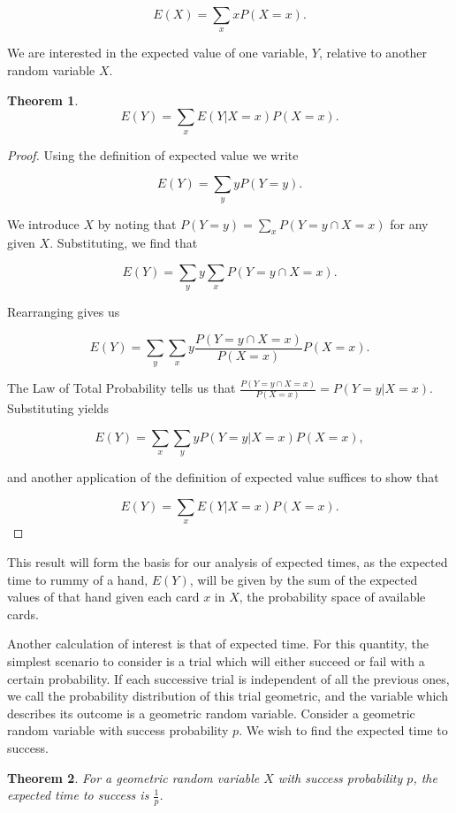 \documentclass[letter,12pt]{article}
\newtheorem{theorem}{Theorem}
\begin{document}
$$E(X) = \sum_{x} x P(X = x).$$

We are interested in the expected value of one variable, $Y$, relative to another random variable $X$.

\begin{theorem}

$$E(Y) = \sum_{x} E(Y | X = x) P(X = x).$$
\end{theorem}

\begin{proof}
Using the definition of expected value we write

$$E(Y) = \sum_{y} y P(Y = y).$$

We introduce $X$ by noting that $P(Y=y)=\sum_{x} P(Y=y \cap X = x) $ for any given $X$. Substituting, we find that

$$E(Y) = \sum_{y} y \sum_{x} P(Y = y \cap X = x).$$

Rearranging gives us

$$E(Y) = \sum_{y} \sum_{x} y \frac{P(Y = y \cap X = x)}{P(X=x)} P(X=x).$$

The Law of Total Probability tells us that $\frac{P(Y=y \cap X=x)}{P(X=x)} = P(Y=y | X=x)$. Substituting yields

$$E(Y) = \sum_{x} \sum_{y} y P(Y=y | X=x) P(X=x), $$

and another application of the definition of expected value suffices to show that

$$E(Y) =  \sum_{x} E(Y | X = x) P(X = x).$$

\end{proof}

This result will form the basis for our analysis of expected times, as the expected time to rummy of a hand, $E(Y)$, will be given by the sum of the expected values of that hand given each card $x$ in $X$, the probability space of available cards.

Another calculation of interest is that of expected time. For this quantity, the simplest scenario to consider is a trial which will either succeed or fail with a certain probability. If each successive trial is independent of all the previous ones, we call the probability distribution of this trial geometric, and the variable which describes its outcome is a geometric random variable. Consider a geometric random variable with success probability $p$. We wish to find the expected time to success.

\begin{theorem}
For a geometric random variable $X$ with success probability $p$, the expected time to success is $\frac{1}{p}$. 
\end{theorem}
\end{document}
